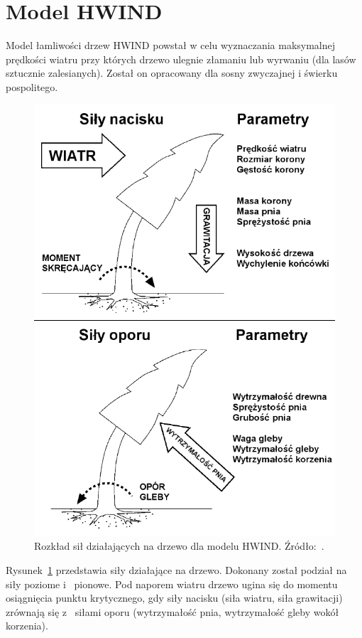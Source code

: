 \section{Model HWIND}

Model łamliwości drzew HWIND powstał w celu wyznaczania maksymalnej prędkości wiatru przy których drzewo ulegnie złamaniu lub wyrwaniu (dla lasów sztucznie zalesianych). Został on opracowany dla sosny zwyczajnej i świerku pospolitego.

\begin{figure}[!h]
\label{fig:hwindScheme1}
	\center
	\includegraphics[scale=0.45]{HWIND1}
	\caption{Rozkład sił działających na drzewo dla modelu HWIND. Źródło:~\cite{chm_mgza}.}

\end{figure} 

Rysunek~\ref{fig:hwindScheme1} przedstawia siły działające na drzewo. Dokonany został podział na siły poziome i ~pionowe.
Pod naporem wiatru drzewo ugina się do momentu osiągnięcia punktu krytycznego, gdy siły nacisku (siła wiatru, siła grawitacji) zrównają się z ~siłami oporu (wytrzymałość pnia, wytrzymałość gleby wokół korzenia).

